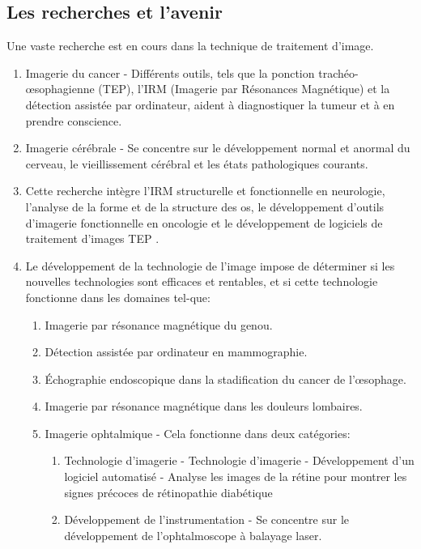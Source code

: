 \documentclass[12pt]{article}
\begin{document}
\subsection{Les recherches et l’avenir}
Une vaste recherche est en cours dans la technique de traitement d'image.
\begin{enumerate}
	\item Imagerie du cancer - Différents outils, tels que la ponction trachéo-œsophagienne (TEP), l'IRM (Imagerie par Résonances Magnétique) et la détection assistée par ordinateur, aident à diagnostiquer la tumeur et à en prendre conscience.
	\item Imagerie cérébrale - Se concentre sur le développement normal et anormal du cerveau, le vieillissement cérébral et les états pathologiques courants.
	\item Cette recherche intègre l'IRM structurelle et fonctionnelle en neurologie, l'analyse de la forme et de la structure des os, le développement d'outils d'imagerie fonctionnelle en oncologie et le développement de logiciels de traitement d'images TEP \cite{25}.
	\item Le développement de la technologie de l'image impose de déterminer si les nouvelles technologies sont efficaces et rentables, et si cette technologie fonctionne dans les domaines tel-que:
	\begin{enumerate}
		\item Imagerie par résonance magnétique du genou.
		\item Détection assistée par ordinateur en mammographie.
		\item Échographie endoscopique dans la stadification du cancer de l'œsophage.
		\item Imagerie par résonance magnétique dans les douleurs lombaires.
		\item Imagerie ophtalmique - Cela fonctionne dans deux catégories:
		\begin{enumerate}
			\item Technologie d'imagerie - Technologie d'imagerie - Développement d'un logiciel automatisé - Analyse les images de la rétine pour montrer les signes précoces de rétinopathie diabétique
			\item Développement de l'instrumentation - Se concentre sur le développement de l'ophtalmoscope à balayage laser.
		\end{enumerate}
	\end{enumerate}
\end{enumerate}
\end{document}
